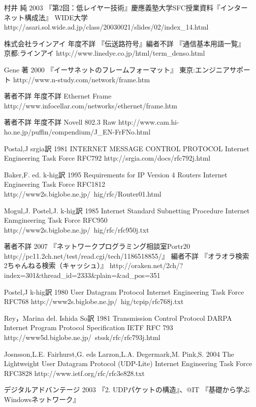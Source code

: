 \begin{thebibliography}{99}
\item
     村井 純
	2003
	『第2回：低レイヤー技術』慶應義塾大学SFC授業資料『インターネット構成法』
	WIDE大学
     http://asari.sol.wide.ad.jp/class/20030021/slides/02/index\_14.html
\item
     株式会社ラインアイ
	年度不詳
	『伝送路符号』編者不詳 『通信基本用語一覧』
	京都:ラインアイ
     http://www.linedye.co.jp/html/term\_denso.html
\item
	Gene 著
	2000
	『イーサネットのフレームフォーマット』
	東京:エンジニアサポート
	http://www.n-study.com/network/frame.htm
\item
	著者不詳
	年度不詳
	Ethernet Frame
	http://www.infocellar.com/networks/ethernet/frame.htm
\item
	著者不詳
	年度不詳
	Novell 802.3 Raw
	http://www.cam.hi-ho.ne.jp/puffin/compendium/J\_EN-FrFNo.html
\item
      Postal,J
	srgia訳
	1981
	INTERNET MESSAGE CONTROL PROTOCOL Internet Engineering Task Force RFC792
     http://srgia.com/docs/rfc792j.html
\item
      Baker,F. ed. 
	k-hig訳
	1995
	Requirements for IP Version 4 Routers Internet Engineering Task Force RFC1812
     http://www2s.biglobe.ne.jp/~hig/rfc/Router01.html
\item
      Mogul,J. Postel,J.
	k-hig訳 
	1985
	Internet Standard Subnetting Procedure Internet Enmgineering Task Force RFC950
	http://www2s.biglobe.ne.jp/~hig/rfc/rfc950j.txt
\item
    著者不詳
	2007
	『ネットワークプログラミング相談室Portr20 http://pc11.2ch.net/test/read.cgi/tech/1186518855/』 
	編者不詳 
	『オラオラ検索 2ちゃんねる検索（キャッシュ）』
    http://oraken.net/2ch/?index=301\&thread\_id=2333\&plain=\&ad\_pos=351
\item
      Postel,J
	k-hig訳
	1980
	User Datagram Protocol Internet Engineering Task Force RFC768
     http://www2s.biglobe.ne.jp/~hig/tcpip/rfc768j.txt
\item
      Rey，Marina del.
	Ishida So訳
	1981
	Transmission Control Protocol DARPA Internet Program Protocol Specification IETF RFC 793
     http://www5d.biglobe.ne.jp/~stssk/rfc/rfc793j.html
\item
     Josnsson,L.E. Fairhurst,G. eds Larzon,L.A. Degermark,M. Pink,S.
	2004
	The Lightweight User Datagram Protocol (UDP-Lite) Internet Engineering Task Force RFC3828
     http://www.ietf.org/rfc/rfc3e828.txt
\item
     デジタルアドバンテージ
	2003
	『2. UDPパケットの構造』、@IT 『基礎から学ぶWindowsネットワーク』

\end{thebibliography}
